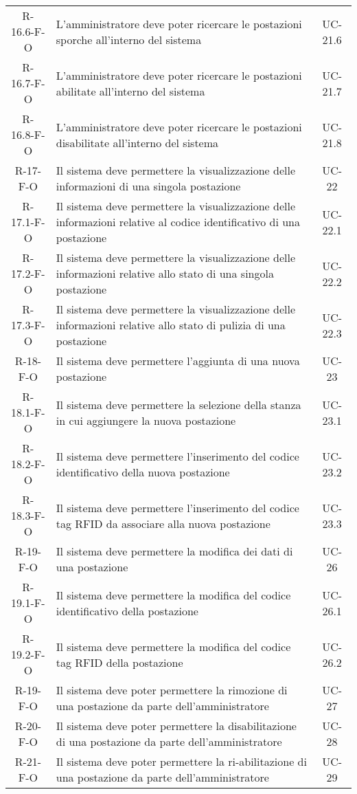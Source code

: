 \begin{longtable}{ c C{9.5cm} c }
    R-16.6-F-O & L'amministratore deve poter ricercare le postazioni sporche all'interno del sistema& UC- 21.6\\
    R-16.7-F-O & L'amministratore deve poter ricercare le postazioni abilitate all'interno del sistema& UC- 21.7\\
    R-16.8-F-O & L'amministratore deve poter ricercare le postazioni disabilitate all'interno del sistema& UC- 21.8\\
    R-17-F-O & Il sistema deve permettere la visualizzazione delle informazioni di una singola postazione& UC- 22\\
    R-17.1-F-O & Il sistema deve permettere la visualizzazione delle informazioni relative al codice identificativo di una postazione & UC- 22.1\\
    R-17.2-F-O & Il sistema deve permettere la visualizzazione delle informazioni relative allo stato di una singola postazione& UC- 22.2\\
    R-17.3-F-O & Il sistema deve permettere la visualizzazione delle informazioni relative allo stato di pulizia di una postazione & UC- 22.3\\
    R-18-F-O & Il sistema deve permettere l'aggiunta di una nuova postazione& UC- 23\\
    R-18.1-F-O & Il sistema deve permettere la selezione della stanza in cui aggiungere la nuova postazione& UC- 23.1\\
    R-18.2-F-O & Il sistema deve permettere l'inserimento del codice identificativo della nuova postazione& UC- 23.2\\
    R-18.3-F-O & Il sistema deve permettere l'inserimento del codice tag RFID da associare alla nuova postazione& UC- 23.3\\
    R-19-F-O & Il sistema deve permettere la modifica dei dati di una postazione& UC- 26\\
    R-19.1-F-O & Il sistema deve permettere la modifica del codice identificativo della postazione& UC- 26.1\\
    R-19.2-F-O & Il sistema deve permettere la modifica del codice tag RFID della postazione& UC- 26.2\\
    R-19-F-O &  Il sistema deve poter permettere la rimozione di una postazione da parte dell'amministratore& UC- 27\\
    R-20-F-O &  Il sistema deve poter permettere la disabilitazione di una postazione da parte dell'amministratore& UC- 28\\
    R-21-F-O &  Il sistema deve poter permettere la ri-abilitazione di una postazione da parte dell'amministratore& UC- 29\\

\end{longtable}
